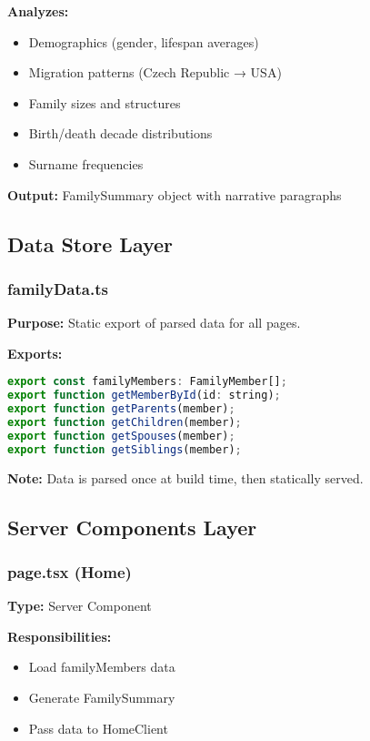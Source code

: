 \documentclass[11pt]{article}
\begin{document}
\textbf{Analyzes:}
\begin{itemize}
    \item Demographics (gender, lifespan averages)
    \item Migration patterns (Czech Republic → USA)
    \item Family sizes and structures
    \item Birth/death decade distributions
    \item Surname frequencies
\end{itemize}

\textbf{Output:} FamilySummary object with narrative paragraphs

\subsection{Data Store Layer}

\subsubsection{familyData.ts}
\textbf{Purpose:} Static export of parsed data for all pages.

\textbf{Exports:}
\begin{lstlisting}[language=JavaScript, basicstyle=\small\ttfamily]
export const familyMembers: FamilyMember[];
export function getMemberById(id: string);
export function getParents(member);
export function getChildren(member);
export function getSpouses(member);
export function getSiblings(member);
\end{lstlisting}

\textbf{Note:} Data is parsed once at build time, then statically served.

\subsection{Server Components Layer}

\subsubsection{page.tsx (Home)}
\textbf{Type:} Server Component

\textbf{Responsibilities:}
\begin{itemize}
    \item Load familyMembers data
    \item Generate FamilySummary
    \item Pass data to HomeClient
\end{itemize}
\end{document}
